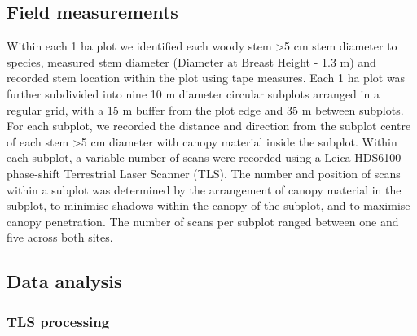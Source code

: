 \documentclass[11pt,a4paper]{article}
\begin{document}
\subsection{Field measurements}

Within each 1 ha plot we identified each woody stem >5 cm stem diameter to species, measured stem diameter (Diameter at Breast Height - 1.3 m) and recorded stem location within the plot using tape measures. Each 1 ha plot was further subdivided into nine 10 m diameter circular subplots arranged in a regular grid, with a 15 m buffer from the plot edge and 35 m between subplots. For each subplot, we recorded the distance and direction from the subplot centre of each stem >5 cm diameter with canopy material inside the subplot. Within each subplot, a variable number of scans were recorded using a Leica HDS6100 phase-shift Terrestrial Laser Scanner (TLS). The number and position of scans within a subplot was determined by the arrangement of canopy material in the subplot, to minimise shadows within the canopy of the subplot, and to maximise canopy penetration. The number of scans per subplot ranged between one and five across both sites. 

\subsection{Data analysis}

\subsubsection{TLS processing}
\end{document}
